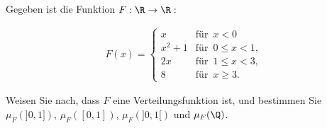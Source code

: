 
\begin{exercise}

Gegeben ist die Funktion $F: \R \to \R:$

\begin{align*}
  F(x) =
  \begin{cases}
    x       & \text{für} \enspace x < 0 \\
    x^2 + 1 & \text{für} \enspace 0 \leq x < 1, \\
    2x      & \text{für} \enspace 1 \leq x < 3, \\
    8       & \text{für} \enspace x \geq 3.
  \end{cases}
\end{align*}

Weisen Sie nach, dass $F$ eine Verteilungsfunktion ist, und bestimmen Sie $\mu_F(]0, 1])$, $\mu_F([0, 1])$, $\mu_F(]0, 1[)$ und $\mu_F(\Q)$.

\end{exercise}


